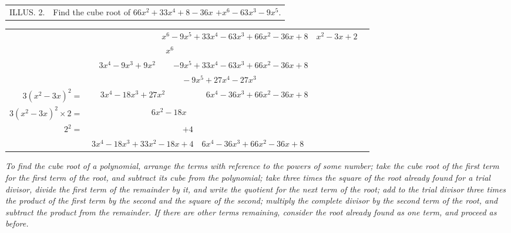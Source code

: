 \documentclass{book}
\begin{document}
\begin{center}
\begin{tabular}{ll}
ILLUS. 2. &Find the cube root of $66 x^{2} + 33 x^{4} + 8 - 36 x$
$+ x^{6} - 63 x^{3} - 9 x^{5}$.\\
\end{tabular}
\end{center}
\begin{tabular}{rccccccccccc}
&&&\multicolumn{7}{r|}{$\scriptstyle x^6-9x^5 +33x^4 -63x^3 +66x^2
-36x +8$}
& $\scriptstyle x^2 -3x+2$\\
\cline{11-11}
&\multicolumn{4}{r}{$\scriptstyle x^6$}&\multicolumn{5}{r|}{}\\
\cline{4-10}

&&\multicolumn{2}{l}{$\scriptstyle 3x^4 - 9x^3+9x^2$} &
\multicolumn{6}{|r}{$\scriptstyle -9x^5 +33x^4
-63x^3 +66x^2 -36x +8$}\\
&&&&\multicolumn{6}{|l}{$\scriptstyle \quad -9x^5 +27x^4 -27x^3 $}\\
\cline{5-10}

$\scriptstyle 3(x^2 - 3x)^2 = $& &\multicolumn{2}{r}{$\scriptstyle
3x^4-18x^3 +27x^2$}
&&&\multicolumn{4}{|r}{$\scriptstyle 6x^4 -36x^3 + 66 x^2 -36x +8$}\\
$\scriptstyle 3(x^2 - 3x)^2 \times 2 =$&&&\multicolumn{3}{c}{$\scriptstyle \quad 6x^2 -18x$}&\multicolumn{4}{|c}{}\\

$\scriptstyle 2^2=$ &&&&&$\scriptstyle +4$&\multicolumn{4}{|c}{}\\
\cline{3-6}

& \multicolumn{5}{r}{$\scriptstyle 3x^4-18x^3 +33x^2 -18x +4$}& \multicolumn{5}{|l}{$\scriptstyle 6x^4 -36x^3 + 66 x^2 -36x +8$}\\
\cline{7-11}
\end{tabular}


\textit{To find the cube root of a polynomial, arrange
the terms with reference to the powers of some number;
take the cube root of the first term for the first
term of the root, and subtract its cube from the
polynomial; take three times the square of the root
already found for a trial divisor, divide the first
term of the remainder by it, and write the quotient
for the next term of the root; add to the trial
divisor three times the product of the first term by
the second and the square of the second; multiply
the complete divisor by the second term of the root,
and subtract the product from the remainder. If
there are other terms remaining, consider the root
already found as one term, and proceed as before.}
\end{document}
